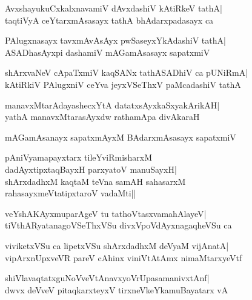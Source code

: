 \documentclass[twoside,12pt,openright]{book}
\newcounter{shloka}[chapter]
\begin{document}
\begin{shloka}%
AvxshayukuCxkalxnavamiV dAvxdashiV kAtiRkeV tathA|\\
taqtiVyA ceYtarxmAsasayx tathA bhAdarxpadasayx ca
\end{shloka}

\begin{shloka}%
PAlugxnasayx tavxmAvAsAyx pwSaseyxYkAdashiV tathA|\\
ASADhasAyxpi dashamiV mAGamAsasayx sapatxmiV
\end{shloka}

\begin{shloka}%
shArxvaNeV cApaTxmiV kaqSANx tathASADhiV ca pUNiRmA|\\
kAtiRkiV PAlugxniV ceYva jeyxVSeThxV paMcadashiV tathA
\end{shloka}

\begin{shloka}%
manavxMtarAdayashecxYtA datatxsAyxkaSxyakArikAH|\\
yathA manavxMtarasAyxdw rathamApa divAkaraH
\end{shloka}

\begin{shloka}%
mAGamAsanayx sapatxmAyxM BAdarxmAsasayx sapatxmiV
\end{shloka}

\begin{shloka}%
pAniVyamapayxtarx tileYviRmisharxM \\
dadAyxtipxtaqBayxH parxyatoV manuSayxH|\\
shArxdadhxM kaqtaM teVna samAH sahasarxM\\
rahasayxmeVtatipxtaroV vadaMti||
\end{shloka}

\begin{shloka}%
veYshAKAyxmuparAgeV tu tathoVtasxvamahAlayeV|\\
tiVthARyatanagoVSeThxVSu divxVpoVdAyxnagaqheVSu ca
\end{shloka}

\begin{shloka}%
viviketxVSu ca lipetxVSu shArxdadhxM deVyaM vijAnatA|\\
vipArxnUpxveVR pareV cAhinx viniVtAtAmx nimaMtarxyeVtf
\end{shloka}

\begin{shloka}%
shiVlavaqtatxguNoVveVtAnavxyoVrUpasamanivxtAnf|\\
dwvx deVveV pitaqkarxteyxV tirxneVkeYkamuBayatarx vA
\end{shloka}
\end{document}
